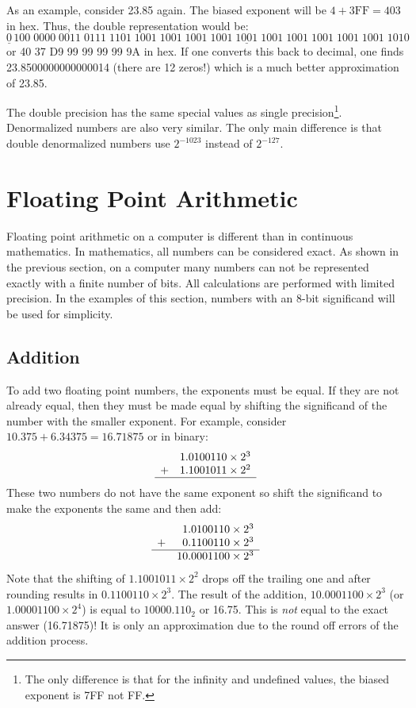 {As an example, consider 23.85 again. The biased exponent will be 
$4 + \mathrm{3FF} = 403$ in hex. Thus, the double representation would be:
\[ \underline{0}\,100\;0000\;0011\;\underline{0111\;1101\;1001\;1001\;1001\;
   1001\;1001\;1001\;1001\;1001\;1001\;1001\;1010} \]
or 40 37 D9 99 99 99 99 9A in hex. If one converts this back to decimal, one
finds 23.8500000000000014 (there are 12 zeros!) which is a much better 
approximation of 23.85.

The double precision has the same special values as single
precision\footnote{The only difference is that for the infinity and
undefined values, the biased exponent is 7FF not FF.}. Denormalized
numbers are also very similar. The only main difference is that double
denormalized numbers use $2^{-1023}$ instead of $2^{-127}$.

\section{Floating Point Arithmetic}

Floating point arithmetic on a computer is different than in 
continuous mathematics. In mathematics, all numbers can be considered exact.
As shown in the previous section, on a computer many numbers can not be
represented exactly with a finite number of bits. All calculations are
performed with limited precision. In the examples of this section, numbers
with an 8-bit significand will be used for simplicity.

\subsection{Addition}
To add two floating point numbers, the exponents must be equal. If
they are not already equal, then they must be made equal by shifting
the significand of the number with the smaller exponent. For example,
consider $10.375 + 6.34375 = 16.71875$ or in binary:
\[
\begin{array}{rr}
 & 1.0100110 \times 2^3 \\
+& 1.1001011 \times 2^2 \\ \hline
\end{array}
\]
These two numbers do not have the same exponent so shift the significand to
make the exponents the same and then add:
\[
\begin{array}{rr@{.}l}
 &  1&0100110 \times 2^3 \\
+&  0&1100110 \times 2^3 \\ \hline
 & 10&0001100 \times 2^3
\end{array}
\]
Note that the shifting of $1.1001011 \times 2^2$ drops off the trailing one
and after rounding results in $0.1100110 \times 2^3$. The result of the
addition, $10.0001100 \times 2^3$ (or $1.00001100 \times 2^4$) is equal to
$10000.110_2$ or 16.75. This is \emph{not} equal to the exact answer
(16.71875)! It is only an approximation due to the round off errors of the
addition process. 

}
